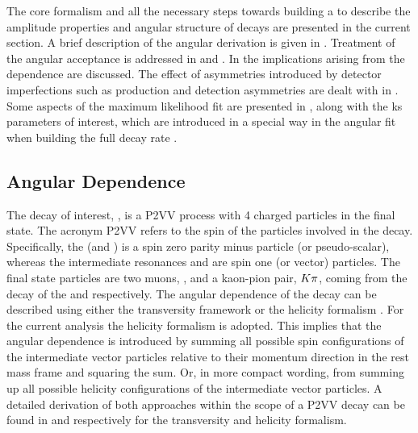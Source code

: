 
The core formalism and all the necessary steps towards building a \pdf to describe the amplitude properties and angular structure of \BJpsiKst decays are presented in
the current section. A brief description of the angular \pdf derivation is given in .
Treatment of the angular acceptance is addressed in  and .
In  the implications arising from the \mkpi dependence are discussed.
The effect of asymmetries introduced by detector imperfections such as production and detection asymmetries are dealt with
in . Some aspects of the maximum likelihood fit are presented in ,
along with the \Acp{k} parameters of interest, which are introduced in a special way in the angular fit when building the full decay rate \pdf.


\subsection{Angular Dependence}
\label{Diferential_Decay_Rate}

The decay of interest, \BsJpsiKst, is a P2VV process with 4 charged particles in the final state.
The acronym P2VV refers to the spin of the particles involved in the decay.
Specifically, the \Bs (and \Bd) is a spin zero parity minus particle (or pseudo-scalar), whereas the intermediate resonances
\jpsi and \Kstarzb are spin one (or vector) particles. The final state particles are
two muons, \mmu, and a kaon-pion pair, $K\pi$, coming from the decay of the \jpsi and \Kstarzb respectively.
The angular dependence of the \BsJpsiKst decay can be described using either the transversity framework \cite{transvFrameworkI,transvFrameworkII}
or the helicity formalism \cite{helicityFormI,helicityFormII}. For the current analysis the helicity
formalism is adopted. This implies that the angular dependence is introduced by summing all possible
spin configurations of the intermediate vector particles relative to their momentum direction in the
\Bs rest mass frame and squaring the sum. Or, in more compact wording, from summing up all possible
helicity configurations of the intermediate vector particles. A detailed derivation of both approaches
within the scope of a P2VV decay can be found in \cite{daanThesis} and \cite{jeroenThesis} respectively
for the transversity and helicity formalism.


